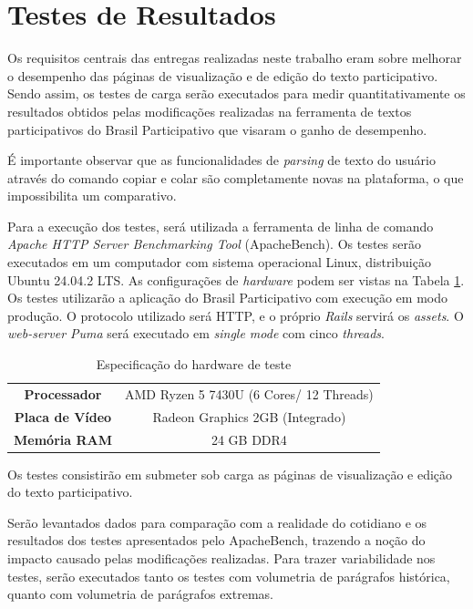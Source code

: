 \section {Testes de Resultados}
\label{sec:resultados}

Os requisitos centrais das entregas realizadas neste trabalho eram sobre melhorar o desempenho das páginas de visualização e de edição do texto participativo.
Sendo assim, os testes de carga serão executados para medir quantitativamente os resultados obtidos pelas modificações realizadas na ferramenta de textos participativos do Brasil Participativo que visaram o ganho de desempenho.

É importante observar que as funcionalidades de \textit{parsing} de texto do usuário através do comando copiar e colar são completamente novas na plataforma, o que impossibilita um comparativo.

Para a execução dos testes, será utilizada a ferramenta de linha de comando \textit{Apache HTTP Server Benchmarking Tool} (ApacheBench).
Os testes serão executados em um computador com sistema operacional Linux, distribuição Ubuntu 24.04.2 LTS. As configurações de \textit{hardware} podem ser vistas na Tabela \ref{tab:especificacao-hardware-de-teste}.
Os testes utilizarão a aplicação do Brasil Participativo com execução em modo produção.
O protocolo utilizado será HTTP, e o próprio \textit{Rails} servirá os \textit{assets}.
O \textit{web-server Puma} será executado em \textit{single mode} com cinco \textit{threads}.

\begin{table}[h]
	\centering
	\caption{Especificação do hardware de teste}
	\label{tab:especificacao-hardware-de-teste}
	\begin{tabular}{cc}
    \toprule
    \textbf{Processador} & AMD Ryzen 5 7430U (6 Cores/ 12 Threads) \\
    \textbf{Placa de Vídeo} & Radeon Graphics 2GB (Integrado) \\
    \textbf{Memória RAM} & 24 GB DDR4 \\
		\bottomrule
	\end{tabular}
\end{table}

Os testes consistirão em submeter sob carga as páginas de visualização e edição do texto participativo.

Serão levantados dados para comparação com a realidade do cotidiano e os resultados dos testes apresentados pelo ApacheBench, trazendo a noção do impacto causado pelas modificações realizadas. Para trazer variabilidade nos testes, serão executados tanto os testes com volumetria de parágrafos histórica, quanto com volumetria de parágrafos extremas.

